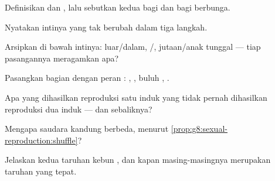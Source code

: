 \begin{exercise}[$\star$]\label{exo:g8:sexual-reproduction:1}
Definisikan  dan , lalu sebutkan kedua  bagi 
dan bagi  berbunga.
\end{exercise}

\begin{exercise}[$\star$]\label{exo:g8:sexual-reproduction:2}
Nyatakan intinya yang tak berubah dalam tiga langkah.
\end{exercise}

\begin{exercise}[$\star$]\label{exo:g8:sexual-reproduction:3}
Arsipkan di bawah intinya:  luar/dalam, /,
jutaan/anak tunggal --- tiap pasangannya meragamkan apa?
\end{exercise}

\begin{exercise}[$\star$]\label{exo:g8:sexual-reproduction:4}
Pasangkan bagian  dengan peran : ,
, buluh , .
\end{exercise}

\begin{exercise}[$\star$]\label{exo:g8:sexual-reproduction:5}
Apa yang dihasilkan reproduksi satu induk yang tidak pernah dihasilkan
reproduksi dua induk --- dan sebaliknya?
\end{exercise}

\begin{exercise}[$\star$]\label{exo:g8:sexual-reproduction:6}
Mengapa saudara kandung berbeda, menurut
\cref{prop:g8:sexual-reproduction:shuffle}?
\end{exercise}

\begin{exercise}[$\star\star$]\label{exo:g8:sexual-reproduction:7}
Jelaskan kedua taruhan kebun , dan kapan masing-masingnya
merupakan taruhan yang tepat.
\end{exercise}

